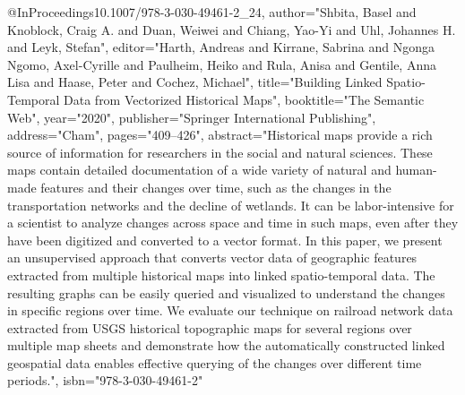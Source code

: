 @InProceedings{10.1007/978-3-030-49461-2_24,
author="Shbita, Basel
and Knoblock, Craig A.
and Duan, Weiwei
and Chiang, Yao-Yi
and Uhl, Johannes H.
and Leyk, Stefan",
editor="Harth, Andreas
and Kirrane, Sabrina
and Ngonga Ngomo, Axel-Cyrille
and Paulheim, Heiko
and Rula, Anisa
and Gentile, Anna Lisa
and Haase, Peter
and Cochez, Michael",
title="Building Linked Spatio-Temporal Data from Vectorized Historical Maps",
booktitle="The Semantic Web",
year="2020",
publisher="Springer International Publishing",
address="Cham",
pages="409--426",
abstract="Historical maps provide a rich source of information for researchers in the social and natural sciences. These maps contain detailed documentation of a wide variety of natural and human-made features and their changes over time, such as the changes in the transportation networks and the decline of wetlands. It can be labor-intensive for a scientist to analyze changes across space and time in such maps, even after they have been digitized and converted to a vector format. In this paper, we present an unsupervised approach that converts vector data of geographic features extracted from multiple historical maps into linked spatio-temporal data. The resulting graphs can be easily queried and visualized to understand the changes in specific regions over time. We evaluate our technique on railroad network data extracted from USGS historical topographic maps for several regions over multiple map sheets and demonstrate how the automatically constructed linked geospatial data enables effective querying of the changes over different time periods.",
isbn="978-3-030-49461-2"
}

